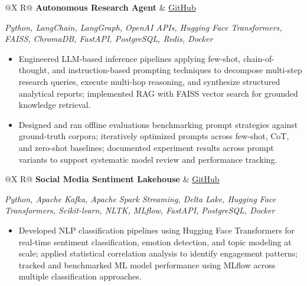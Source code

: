 \documentclass[a4paper,10pt]{article}
\newcommand{\ulink}[2]{\href{#1}{\uline{#2}}}
\newcommand{\subheading}[1]{{\color[HTML]{0A0A0A}\fontsize{12}{14}\selectfont\bfseries #1}}
\newcommand{\techstack}[1]{{\color[HTML]{5C5C5C}\fontsize{10.5}{12.5}\selectfont\itshape #1}}
\newcommand{\meta}[1]{{\color[HTML]{5C5C5C}\fontsize{10.5}{12.5}\selectfont #1}}
\begin{document}
\vspace{4pt}

\begin{tabularx}{\linewidth}{@{}X R@{}}
\subheading{Autonomous Research Agent} & \meta{\ulink{https://github.com/su-jin1425/Autonomous-Research-Agent}{GitHub}}
\end{tabularx}
\vspace{1pt}
\techstack{Python, LangChain, LangGraph, OpenAI APIs, Hugging Face Transformers, FAISS, ChromaDB, FastAPI, PostgreSQL, Redis, Docker}
\begin{itemize}[nosep, leftmargin=1.5em, itemsep=1pt, topsep=2pt]
\item {\color[HTML]{0A0A0A}\fontsize{11}{14}\selectfont
Engineered LLM-based inference pipelines applying few-shot, chain-of-thought, and instruction-based prompting techniques to decompose multi-step research queries, execute multi-hop reasoning, and synthesize structured analytical reports; implemented RAG with FAISS vector search for grounded knowledge retrieval.}
\item {\color[HTML]{0A0A0A}\fontsize{11}{14}\selectfont
Designed and ran offline evaluations benchmarking prompt strategies against ground-truth corpora; iteratively optimized prompts across few-shot, CoT, and zero-shot baselines; documented experiment results across prompt variants to support systematic model review and performance tracking.}
\end{itemize}

\vspace{4pt}

\begin{tabularx}{\linewidth}{@{}X R@{}}
\subheading{Social Media Sentiment Lakehouse} & \meta{\ulink{https://github.com/su-jin1425/Social-Media-Sentiment-Lakehouse}{GitHub}}
\end{tabularx}
\vspace{1pt}
\techstack{Python, Apache Kafka, Apache Spark Streaming, Delta Lake, Hugging Face Transformers, Scikit-learn, NLTK, MLflow, FastAPI, PostgreSQL, Docker}
\begin{itemize}[nosep, leftmargin=1.5em, itemsep=1pt, topsep=2pt]
\item {\color[HTML]{0A0A0A}\fontsize{11}{14}\selectfont
Developed NLP classification pipelines using Hugging Face Transformers for real-time sentiment classification, emotion detection, and topic modeling at scale; applied statistical correlation analysis to identify engagement patterns; tracked and benchmarked ML model performance using MLflow across multiple classification approaches.}
\end{itemize}
\end{document}
